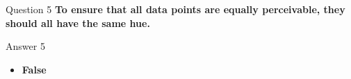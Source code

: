 \documentclass[
  ignorenonframetext,
]{beamer}
\providecommand{\tightlist}{%
  \setlength{\itemsep}{0pt}\setlength{\parskip}{0pt}}
\begin{document}
\begin{frame}{Question 5}
\label{question-5}
\textbf{To ensure that all data points are equally perceivable, they
should all have the same hue.}
\end{frame}

\begin{frame}{Answer 5}
\label{answer-5}
\begin{itemize}
\tightlist
\item
  \textbf{False}
\end{itemize}
\end{frame}
\end{document}
